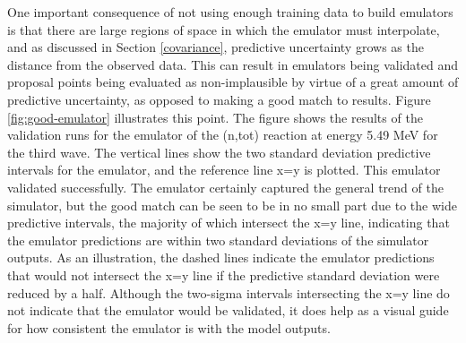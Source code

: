 \documentclass[
  12pt,
  a4paper,
  twoside]{book}
\begin{document}
One important consequence of not using enough training data to build emulators is that there are large regions of space in which the emulator must interpolate, and as discussed in Section \ref{covariance}, predictive uncertainty grows as the distance from the observed data. This can result in emulators being validated and proposal points being evaluated as non-implausible by virtue of a great amount of predictive uncertainty, as opposed to making a good match to results. Figure \ref{fig:good-emulator} illustrates this point. The figure shows the results of the validation runs for the emulator of the (n,tot) reaction at energy 5.49 MeV for the third wave. The vertical lines show the two standard deviation predictive intervals for the emulator, and the reference line x=y is plotted. This emulator validated successfully. The emulator certainly captured the general trend of the simulator, but the good match can be seen to be in no small part due to the wide predictive intervals, the majority of which intersect the x=y line, indicating that the emulator predictions are within two standard deviations of the simulator outputs. As an illustration, the dashed lines indicate the emulator predictions that would not intersect the x=y line if the predictive standard deviation were reduced by a half. Although the two-sigma intervals intersecting the x=y line do not indicate that the emulator would be validated, it does help as a visual guide for how consistent the emulator is with the model outputs.
\end{document}
